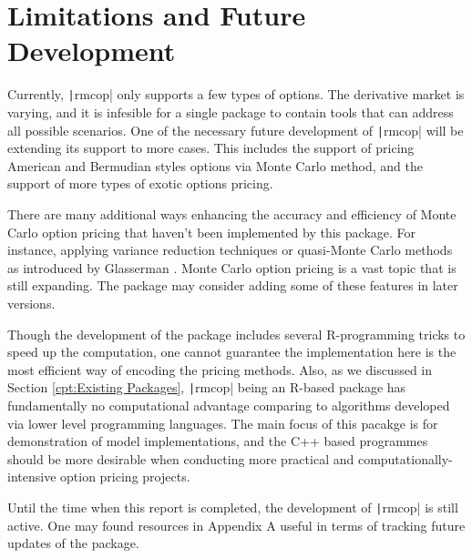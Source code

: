 \section{Limitations and Future Development}

Currently, \texttt|rmcop| only supports a few types of options. The derivative market is varying, and it is infesible for a single package to contain tools that can address all possible scenarios. One of the necessary future development of \texttt|rmcop| will be extending its support to more cases. This includes the support of pricing American and Bermudian styles options via Monte Carlo method, and the support of more types of exotic options pricing.

There are many additional ways enhancing the accuracy and efficiency of Monte Carlo option pricing that haven't been implemented by this package. For instance, applying variance reduction techniques or quasi-Monte Carlo methods as introduced by Glasserman \cite{Glasserman2003}. Monte Carlo option pricing is a vast topic that is still expanding. The package may consider adding some of these features in later versions.

Though the development of the package includes several R-programming tricks to speed up the computation, one cannot guarantee the implementation here is the most efficient way of encoding the pricing methods. Also, as we discussed in Section \ref{cpt:Existing Packages}, \texttt|rmcop| being an R-based package has fundamentally no computational advantage comparing to algorithms developed via lower level programming languages. The main focus of this pacakge is for demonstration of model implementations, and the C++ based programmes should be more desirable when conducting more practical and computationally-intensive option pricing projects.

Until the time when this report is completed, the development of \texttt|rmcop| is still active. One may found resources in Appendix A useful in terms of tracking future updates of the package.

\newpage